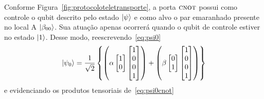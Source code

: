 Conforme Figura~\ref{fig:protocoloteletransporte}, a porta \(\operatorname{\textsc{cnot}}\) possui como controle o qubit descrito pelo estado $\ket{\psi}$ e como alvo o par emaranhado presente no local A $\ket{\beta_{00}}$. Sua atuação apenas ocorrerá quando o qubit de controle estiver no estado $\ket{1}$. Desse modo, reescrevendo~\eqref{eq:psi0}
\begin{equation}\label{eq:psi0cnot}
\ket{\psi_0} = \frac{1}{\sqrt{2}}\left\{\left(\alpha \begin{bmatrix}
1 \\
0 
\end{bmatrix}  \begin{bmatrix}
1 \\
0 \\
0 \\
1
\end{bmatrix}\right) + \left(\beta \begin{bmatrix}
0 \\
1
\end{bmatrix}  \begin{bmatrix}
1 \\
0 \\
0 \\
1
\end{bmatrix}\right) \right\}
\end{equation}
e evidenciando os produtos tensoriais de~\eqref{eq:psi0cnot}
